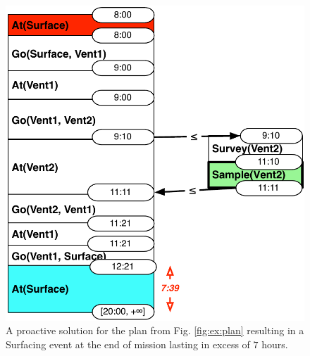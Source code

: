 

\begin{figure}
  \centering
  \includegraphics[width=0.65\columnwidth]{figs/example_early}
  \vskip-3mm
  \caption{\small A proactive solution for the plan from
    Fig. \ref{fig:ex:plan} resulting in a Surfacing event at the end
    of mission lasting in excess of $7$ hours.}
  \label{fig:ex:proactive}
\end{figure}

